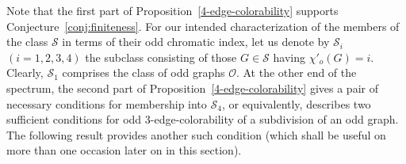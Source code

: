 \documentclass[a4paper,12pt]{article}
\numberwithin{equation}{section}
\begin{document}
Note that the first part of Proposition~\ref{4-edge-colorability} supports Conjecture~\ref{conj:finiteness}. For our intended characterization of the members of the class $\mathcal{S}$ in terms of their odd chromatic index, let us denote by $\mathcal{S}_i$ $(i=1,2,3,4)$ the subclass consisting of those $G\in\mathcal{S}$ having $\chi'_o(G)=i$. Clearly, $\mathcal{S}_1$ comprises the class of odd graphs $\mathcal{O}$. At the other end of the spectrum, the second part of Proposition~\ref{4-edge-colorability} gives a pair of necessary conditions for membership into $\mathcal{S}_4$, or equivalently, describes two sufficient conditions for odd $3$-edge-colorability of a subdivision of an odd graph. The following result provides another such condition (which shall be useful on more than one occasion later on in this section).
\end{document}
